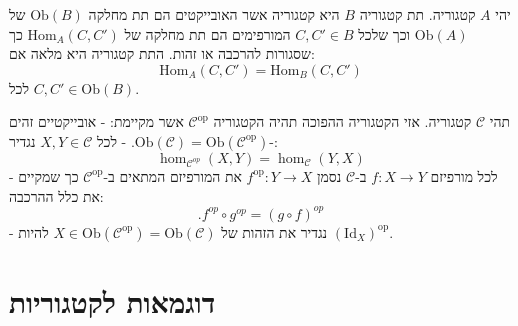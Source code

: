 \documentclass{tstextbook}
\begin{document}
\begin{definition}[תת קטגוריה]
יהי \(A\) קטגוריה. תת קטגוריה \(B\) היא קטגוריה אשר האובייקטים הם תת מחלקה \(\mathrm{Ob}(B)\) של \(\mathrm{Ob}(A)\) וכך שלכל \(C,C' \in B\) המורפימים הם תת מחלקה של \(\mathrm{Hom}_{A}(C,C')\) כך שסגורות להרכבה או זהות. התת קטגוריה היא מלאה אם:
$$\mathrm{Hom}_{A}(C,C')=\mathrm{Hom}_{B}(C,C')$$
לכל \(C,C'\in \mathrm{Ob}(B)\).

\end{definition}
\begin{definition}
תהי \(\mathcal{C}\) קטגוריה. אזי הקטגוריה ההפוכה תהיה הקטגוריה \(\mathcal{C}^{\text{op}}\) אשר מקיימת:
- אובייקטיים זהים -\(\text{Ob}(\mathcal{C})=\text{Ob}(\mathcal{C}^{\text{op}})\).
- לכל \(X,Y\in \mathcal{C}\) נגדיר:
$$\hom_{{\mathcal{C}}^{o p}}\left(X,Y\right)=\hom_{{\mathcal{C}}}\left(Y,X\right)$$
- לכל מורפיזם \(f:X\to Y\) ב-\(\mathcal{C}\) נסמן \(f^{\text{op}}:Y\to X\) את המורפיזם המתאים ב-\(\mathcal{C}^{\text{op}}\) כך שמקיים את כלל ההרכבה:
$$.f^{o p}\circ g^{o p}=(g\circ f)^{o p}$$
- נגדיר את הזהות של \(X \in \mathrm{Ob}(\mathcal{C}^{\text{op}})=\mathrm{Ob}(\mathcal{C})\) להיות \((\mathrm{Id}_{X})^{\text{op}}\).

\end{definition}
\section{דוגמאות לקטגוריות}
\end{document}
